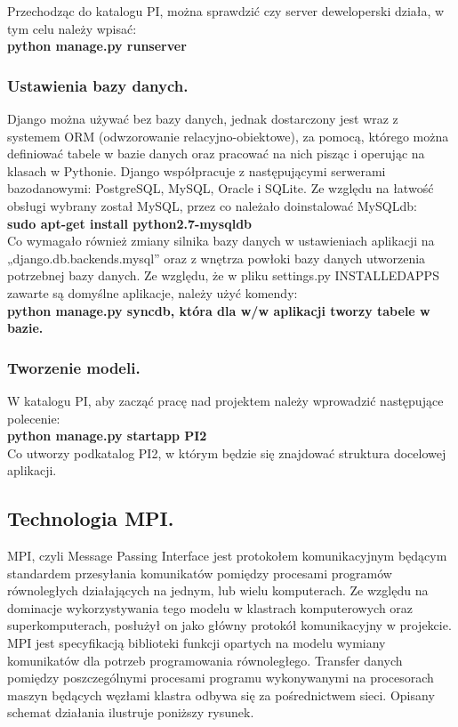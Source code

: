 \documentclass[a4paper,12pt]{article}		%
\begin{document}
Przechodząc do katalogu PI, można sprawdzić czy server deweloperski działa, w tym celu należy wpisać:\\
\textbf{python manage.py runserver}

\subsubsection{Ustawienia bazy danych.}
Django można używać bez bazy danych, jednak dostarczony jest wraz z systemem ORM (odwzorowanie relacyjno-obiektowe), za pomocą, którego można definiować tabele w bazie danych oraz pracować na nich pisząc i operując na klasach w Pythonie. Django współpracuje z następującymi serwerami bazodanowymi: PostgreSQL, MySQL, Oracle i SQLite. Ze względu na łatwość obsługi wybrany został MySQL, przez co należało doinstalować MySQLdb:\\
\textbf{sudo apt-get install python2.7-mysqldb}\\
Co wymagało również zmiany silnika bazy danych w ustawieniach aplikacji na „django.db.backends.mysql” oraz z wnętrza powłoki bazy danych utworzenia 
potrzebnej bazy danych. Ze względu, że w pliku settings.py INSTALLEDAPPS zawarte są domyślne aplikacje, należy użyć komendy:\\
\textbf{python manage.py syncdb, która dla w/w aplikacji tworzy tabele w bazie.}

\subsubsection{Tworzenie modeli.}
W katalogu PI, aby zacząć pracę nad projektem należy wprowadzić następujące polecenie:\\
\textbf{python manage.py startapp PI2}\\
Co utworzy podkatalog PI2, w którym będzie się znajdować struktura docelowej aplikacji.

\subsection{Technologia MPI.}
MPI, czyli Message Passing Interface jest protokołem komunikacyjnym będącym standardem przesyłania komunikatów pomiędzy procesami programów równoległych działających na jednym, lub wielu komputerach. Ze względu na dominacje wykorzystywania tego modelu w klastrach komputerowych oraz superkomputerach, posłużył on jako główny protokół komunikacyjny w projekcie.
MPI jest specyfikacją biblioteki funkcji opartych na modelu wymiany komunikatów dla potrzeb programowania równoległego. Transfer danych pomiędzy poszczególnymi procesami programu wykonywanymi na procesorach maszyn będących węzłami klastra odbywa się za pośrednictwem sieci. Opisany schemat działania ilustruje poniższy rysunek.
\end{document}
